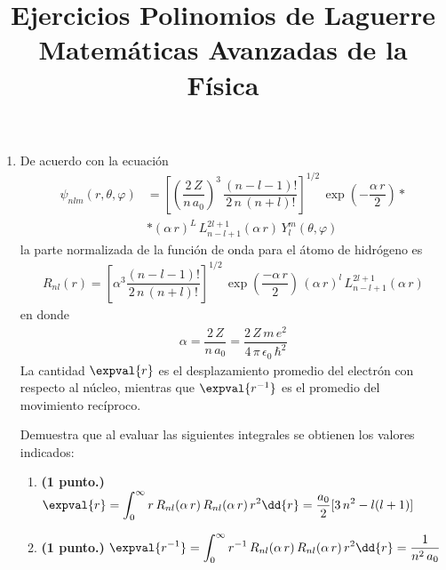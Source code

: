 
\title{Ejercicios Polinomios de Laguerre\\ \large {Matemáticas Avanzadas de la Física}  \vspace{-1.5\baselineskip}}
\date{}
\author{}

\renewcommand\labelenumii{\theenumi.{\arabic{enumii})}}
\maketitle
\fontsize{14}{14}\selectfont
\begin{enumerate}
\item De acuerdo con la ecuación
\begin{align*}
\psi_{n l m} (r , \theta, \varphi) &= \left[ \left( \dfrac{2 \, Z}{n \, a_{0}} \right)^{3} \, \dfrac{(n - l -1)!}{2 \, n \, (n + l)!} \right]^{1/2} \, \exp \left( - \dfrac{\alpha \, r}{2} \right) * \\[1em]
&* (\alpha \, r)^{L} \, L_{n - l +1}^{2 l +1}(\alpha \, r) \, Y_{l}^{m} (\theta, \varphi)
\end{align*}
la parte normalizada de la función de onda para el átomo de hidrógeno es
\begin{align*}
R_{n l} (r) = \left[ \alpha^{3} \dfrac{(n -l -1)!}{2 \, n \, (n + l)!} \right]^{1/2} \, \exp \left( \dfrac{-\alpha \, r}{2} \right) \, (\alpha \, r)^{l} \, L_{n - l +1}^{2 l +1}(\alpha \, r) 
\end{align*}
en donde 
\begin{align*}
\alpha = \dfrac{2 \, Z}{n \, a_{0}} = \dfrac{2 \, Z \, m \, e^{2}}{4 \, \pi \, \epsilon_{0} \, \hbar^{2}}
\end{align*}
La cantidad $\expval{r}$ es el desplazamiento promedio del electrón con respecto al núcleo, mientras que $\expval{r^{-1}}$ es el promedio del movimiento recíproco.
\par
Demuestra que al evaluar las siguientes integrales se obtienen los valores indicados:
\begin{enumerate}
\item \textbf{(1 punto.) } $\displaystyle \expval{r} = \int_{0}^{\infty} r \, R_{n l} (\alpha \, r) \, R_{n l} (\alpha \, r) \, r^{2} \dd{r} = \dfrac{a_{0}}{2} [3 \, n^{2} - l (l + 1)]$
\item \textbf{(1 punto.) } $\displaystyle \expval{r^{-1}} = \int_{0}^{\infty} r^{-1} \, R_{n l} (\alpha \, r) \, R_{n l} (\alpha \, r) \, r^{2} \dd{r} = \dfrac{1}{n^{2} \, a_{0}}$

\end{enumerate}
\end{enumerate}
